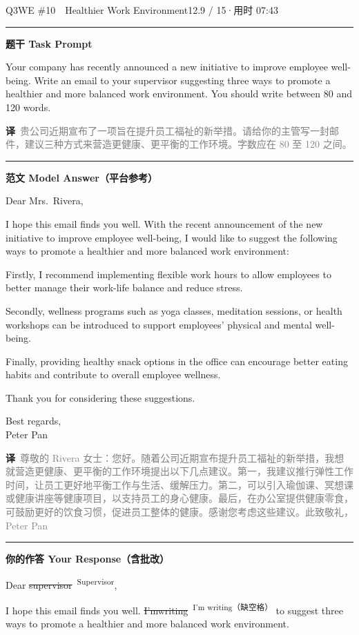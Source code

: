 \documentclass[11pt]{article}
\newcommand{\fix}[2]{%
  \colorbox{cWrongBg}{\textcolor{cWrong}{\sout{#1}}}%
  \,\textsuperscript{\textcolor{cFix}{\footnotesize #2}}}
\newcommand{\ptesub}[1]{%
  \par\needspace{2\baselineskip}\smallskip
  {\color{cAccent}\rule[-0.2ex]{3pt}{1.05em}}\hspace{6pt}%
  {\bfseries\color{cHead}#1}\par\nopagebreak\smallskip}
\newcommand{\zh}[1]{{\footnotesize\textcolor{cNote}{\textbf{译}}\ \textcolor{gray}{#1}}}
\begin{document}
\begin{qblock}{Q3\quad WE \#10\ \ Healthier Work Environment}{12.9 / 15\quad·\quad 用时 07:43}

\ptesub{题干 Task Prompt}
\begin{promptbox}
Your company has recently announced a new initiative to improve employee well-being. Write an email to your supervisor suggesting three ways to promote a healthier and more balanced work environment. You should write between 80 and 120 words.
\end{promptbox}
\zh{贵公司近期宣布了一项旨在提升员工福祉的新举措。请给你的主管写一封邮件，建议三种方式来营造更健康、更平衡的工作环境。字数应在 80 至 120 之间。}

\ptesub{范文 Model Answer（平台参考）}
\begin{modelbox}
Dear Mrs.\ Rivera,

I hope this email finds you well. With the recent announcement of the new initiative to improve employee well-being, I would like to suggest the following ways to promote a healthier and more balanced work environment:

Firstly, I recommend implementing flexible work hours to allow employees to better manage their work-life balance and reduce stress.

Secondly, wellness programs such as yoga classes, meditation sessions, or health workshops can be introduced to support employees' physical and mental well-being.

Finally, providing healthy snack options in the office can encourage better eating habits and contribute to overall employee wellness.

Thank you for considering these suggestions.

Best regards,\\ Peter Pan
\end{modelbox}
\zh{尊敬的 Rivera 女士：您好。随着公司近期宣布提升员工福祉的新举措，我想就营造更健康、更平衡的工作环境提出以下几点建议。第一，我建议推行弹性工作时间，让员工更好地平衡工作与生活、缓解压力。第二，可以引入瑜伽课、冥想课或健康讲座等健康项目，以支持员工的身心健康。最后，在办公室提供健康零食，可鼓励更好的饮食习惯，促进员工整体的健康。感谢您考虑这些建议。此致敬礼，Peter Pan}

\ptesub{你的作答 Your Response（含批改）}
\begin{youbox}
Dear \fix{supervisor}{Supervisor},

I hope this email finds you well. \fix{I'mwriting}{I'm writing（缺空格）} to suggest three ways to promote a healthier and more balanced work environment.


\end{youbox}
\end{qblock}
\end{document}
